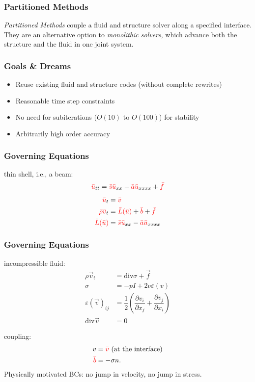 \documentclass[8pt]{beamer}
\newcommand{\leftd}[1]{{\color{red} \bar{#1}}}
\newcommand{\leftdd}[2]{{\color{red} \bar{#1}(\bar{#2})}}
\newcommand{\divergence}{\mathrm{div}}
\begin{document}
\begin{frame}
    \frametitle{Partitioned Methods}
    \emph{Partitioned Methods} couple a fluid and structure solver along a
    specified interface. They are an alternative option to \emph{monolithic
    solvers}, which advance both the structure and the fluid in one joint
    system.
\end{frame}

\begin{frame}
    \frametitle{Goals \& Dreams}
    \begin{itemize}
        \item Reuse existing fluid and structure codes (without complete
              rewrites)
        \item Reasonable time step constraints
        \item No need for subiterations (\(O(10)\) to \(O(100)\)) for stability
        \item Arbitrarily high order accuracy
    \end{itemize}
\end{frame}

\begin{frame}
    \frametitle{Governing Equations}
    thin shell, i.e., a beam:
    \begin{equation}
        \leftd{u}_{tt} = \leftd{s} \leftd{u}_{xx} - \leftd{a} \leftd{u}_{xxxx}
        + \leftd{f}
    \end{equation}
    \pause
    \begin{align}
        \leftd{u}_t              &= \leftd{v}                                 \\
        \leftd{\rho} \leftd{v}_t &= \leftdd{L}{u} + \leftd{b} + \leftd{f}     \\
        \leftdd{L}{u}            &= \leftd{s} \leftd{u}_{xx}
        - \leftd{a} \leftd{u}_{xxxx}
    \end{align}
\end{frame}

\begin{frame}
    \frametitle{Governing Equations}
    incompressible fluid:
    \begin{align}
        \rho \vec{v}_t &= \divergence \sigma + \vec{f}                        \\
        \sigma &= -p I + 2 \nu \varepsilon(v)                                 \\
        \varepsilon(\vec{v})_{ij} &= \dfrac{1}{2}
        \left(
        \dfrac{\partial v_i}{\partial x_j} +
        \dfrac{\partial v_j}{\partial x_i}
        \right)                                                               \\
        \divergence \vec{v} &= 0
    \end{align}

    \pause
    coupling:
    \begin{align}
        v &= \leftd{v} \text{ (at the interface)}                             \\
        \leftd{b} &= -\sigma n.
    \end{align}
    \pause
    Physically motivated BCs: no jump in velocity, no jump in stress.
\end{frame}
\end{document}
